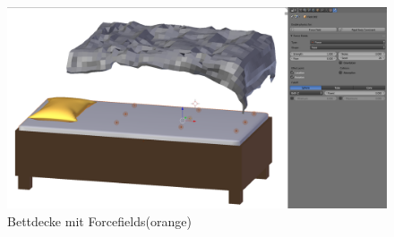 \begin{figure}[h]
    \centering
    \includegraphics[width=.8\textwidth]{images/Bettdecke_Forcefields.png}
    \caption{Bettdecke mit Forcefields(orange)}
    \label{Bettdecke:image1}
\end{figure}
